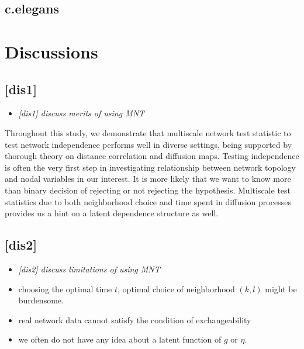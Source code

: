\documentclass[12pt]{article}
\theoremstyle{definition}
\begin{document}
\subsection{c.elegans}


\newpage
\section{Discussions}

\subsection{[dis1]}
\begin{itemize}
	\item {\it  [dis1] discuss merits of using MNT   \/}
\end{itemize}

Throughout this study, we demonstrate that multiscale network test statistic to test network independence performs well in diverse settings, being supported by thorough theory on distance correlation and diffusion maps. 
Testing independence is often the very first step in investigating relationship between network topology and nodal variables in our interest. It is more likely that we want to know more than binary decision of rejecting or not rejecting the hypothesis. Multiscale test statistics due to both neighborhood choice and time spent in diffusion processes provides us a hint on a latent dependence structure as well.  


\subsection{[dis2]}
\begin{itemize}
	\item {\it  [dis2] discuss limitations of using MNT   \/}
\end{itemize}

\begin{itemize}
	\item choosing the optimal time $t$, optimal choice of neighborhood $(k,l)$ might be burdensome. 
	\item real network data cannot satisfy the condition of exchangeability
	\item we often do not have any idea about a latent function of $g$ or $\eta$.
\end{itemize}	
\end{document}
